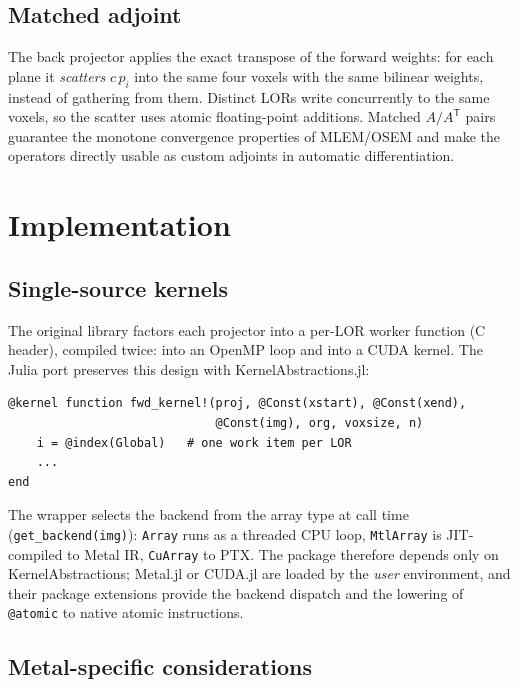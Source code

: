 \documentclass[11pt,a4paper]{article}
\begin{document}
\subsection{Matched adjoint}

The back projector applies the exact transpose of the forward weights: for
each plane it \emph{scatters} $c\,p_i$ into the same four voxels with the same
bilinear weights, instead of gathering from them. Distinct LORs write
concurrently to the same voxels, so the scatter uses atomic floating-point
additions. Matched $A/A^{\mathsf T}$ pairs guarantee the monotone convergence
properties of MLEM/OSEM and make the operators directly usable as
custom adjoints in automatic differentiation.

\section{Implementation}

\subsection{Single-source kernels}

The original library factors each projector into a per-LOR worker function
(C header), compiled twice: into an OpenMP loop and into a CUDA kernel. The
Julia port preserves this design with KernelAbstractions.jl:
\begin{lstlisting}
@kernel function fwd_kernel!(proj, @Const(xstart), @Const(xend),
                             @Const(img), org, voxsize, n)
    i = @index(Global)   # one work item per LOR
    ...
end
\end{lstlisting}
The wrapper selects the backend from the array type at call time
(\texttt{get\_backend(img)}): \texttt{Array} runs as a threaded CPU loop,
\texttt{MtlArray} is JIT-compiled to Metal IR, \texttt{CuArray} to PTX. The
package therefore depends only on KernelAbstractions; Metal.jl or CUDA.jl are
loaded by the \emph{user} environment, and their package extensions provide
the backend dispatch and the lowering of \texttt{@atomic} to native atomic
instructions.

\subsection{Metal-specific considerations}
\end{document}
